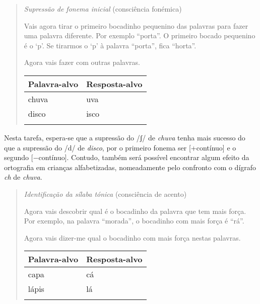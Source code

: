 \documentclass[output=paper,colorlinks,citecolor=brown,booklanguage=portuguese]{langscibook}
\begin{document}
\begin{quote}
\textit{Supressão de fonema inicial} (consciência fonémica)

Vais agora tirar o primeiro bocadinho pequenino das palavras para fazer uma palavra diferente. Por exemplo “porta”. O primeiro bocado pequenino é o ‘p’. Se tirarmos o ‘p’ à palavra “porta”, fica “horta”.

Agora vais fazer com outras palavras.



\begin{Tabela}
\begin{tabularx}{.8\textwidth}{Xl}
\lsptoprule
\textbf{Palavra-alvo} & \textbf{Resposta-alvo}\\
\midrule
chuva & uva\\
disco & isco\\
\lspbottomrule
\end{tabularx}
\end{Tabela}

\end{quote}

Nesta tarefa, espera-se que a supressão do /ʃ/ de \emph{chuva} tenha mais sucesso do que a supressão do /d/ de \emph{disco}, por o primeiro fonema ser [+contínuo] e o segundo [$-$contínuo]. Contudo, também será possível encontrar algum efeito da ortografia em crianças alfabetizadas, nomeadamente pelo confronto com o dígrafo \emph{ch} de \emph{chuva}.

\begin{quote}
\textit{Identificação da sílaba tónica} (consciência de acento)

Agora vais descobrir qual é o bocadinho da palavra que tem mais força. Por exemplo, na palavra “morada”, o bocadinho com mais força é “rá”.

Agora vais dizer-me qual o bocadinho com mais força nestas palavras.



\begin{Tabela}
\begin{tabularx}{.8\textwidth}{Xl}
\lsptoprule
\textbf{Palavra-alvo} & \textbf{Resposta-alvo}\\
\midrule
capa & cá\\
lápis & lá\\
\lspbottomrule
\end{tabularx}
\end{Tabela}

\end{quote}
\end{document}
